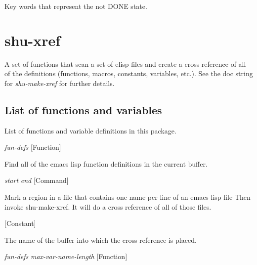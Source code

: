 \begin{doc-string}
Key words that represent the not DONE state.
\end{doc-string}

\eject
\section{shu-xref}



A set of functions that scan a set of elisp files and create a cross reference
of all of the definitions (functions, macros, constants, variables, etc.).
See the doc string for \emph{shu-make-xref} for further details.


\subsection{List of functions and variables}

List of functions and variable definitions in this package.



\vspace{1em}
\noindent
{}
\usebox{\funcname}\emph{fun-defs}
 \hfill [Function]

\begin{doc-string}
Find all of the emacs lisp function definitions in the current buffer.
\end{doc-string}

\vspace{1em}
\noindent
{}
\usebox{\funcname}\emph{start} \emph{end}
 \hfill [Command]

\begin{doc-string}
Mark a region in a file that contains one name per line of an emacs lisp file
Then invoke shu-make-xref.  It will do a cross reference of all of those files.
\end{doc-string}

\vspace{1em}
\noindent
{}
\usebox{\funcname}
 \hfill [Constant]

\begin{doc-string}
The name of the buffer into which the cross reference is placed.
\end{doc-string}

\vspace{1em}
\noindent
{}
\usebox{\funcname}\emph{fun-defs} \emph{max-var-name-length}
 \hfill [Function]
\hspace*{\wd\funcname}

